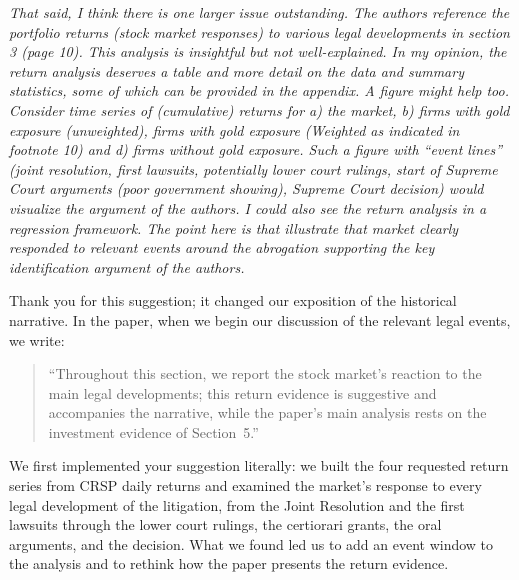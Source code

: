 \noindent \textit{\textcolor{red!60!black}{
That said, I think there is one larger issue outstanding. The authors reference the portfolio returns (stock market responses) to various legal developments in section 3 (page 10). This analysis is insightful but not well-explained. In my opinion, the return analysis deserves a table and more detail on the data and summary statistics, some of which can be provided in the appendix. A figure might help too. Consider time series of (cumulative) returns for a) the market, b) firms with gold exposure (unweighted), firms with gold exposure (Weighted as indicated in footnote 10) and d) firms without gold exposure. Such a figure with ``event lines'' (joint resolution, first lawsuits, potentially lower court rulings, start of Supreme Court arguments (poor government showing), Supreme Court decision) would visualize the argument of the authors. I could also see the return analysis in a regression framework. The point here is that illustrate that market clearly responded to relevant events around the abrogation supporting the key identification argument of the authors.
}}

\bigskip

\noindent Thank you for this suggestion; it changed our exposition of the historical narrative. In the paper, when we begin our discussion of the relevant legal events, we write:

\begin{quote}
``Throughout this section, we report the stock market's reaction to the main legal developments; this return evidence is suggestive and accompanies the narrative, while the paper's main analysis rests on the investment evidence of Section~5.''
\end{quote}

\noindent We first implemented your suggestion literally: we built the four requested return series from CRSP daily returns and examined the market's response to every legal development of the litigation, from the Joint Resolution and the first lawsuits through the lower court rulings, the certiorari grants, the oral arguments, and the decision. What we found led us to add an event window to the analysis and to rethink how the paper presents the return evidence.

